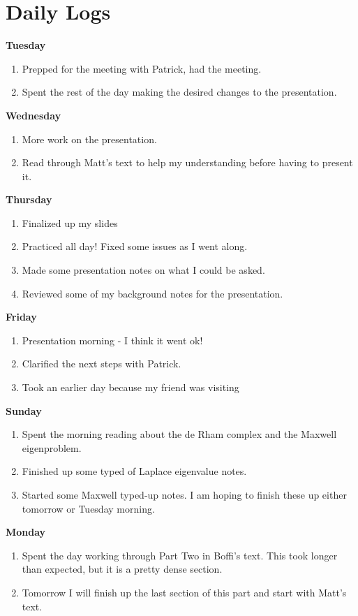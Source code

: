 \documentclass[12pt,a4paper]{article}
\begin{document}
\section{Daily Logs}

\textbf{Tuesday} 
\begin{enumerate}
    \item Prepped for the meeting with Patrick, had the meeting.
    \item Spent the rest of the day making the desired changes to the presentation.  
\end{enumerate}

\textbf{Wednesday}
\begin{enumerate}
    \item More work on the presentation.
    \item Read through Matt's text to help my understanding before having to present it.
\end{enumerate}

\textbf{Thursday}
\begin{enumerate}
    \item Finalized up my slides
    \item Practiced all day! Fixed some issues as I went along.
    \item Made some presentation notes on what I could be asked. 
    \item Reviewed some of my background notes for the presentation.
\end{enumerate}

\textbf{Friday}
\begin{enumerate}
    \item Presentation morning - I think it went ok!
    \item Clarified the next steps with Patrick.
    \item Took an earlier day because my friend was visiting
\end{enumerate}


\textbf{Sunday}
\begin{enumerate}
\item Spent the morning reading about the de Rham complex and the Maxwell eigenproblem.
\item Finished up some typed of Laplace eigenvalue notes.
\item Started some Maxwell typed-up notes. I am hoping to finish these up either tomorrow or Tuesday morning. 
\end{enumerate}

\textbf{Monday}
\begin{enumerate}
\item Spent the day working through Part Two in Boffi's text. This took longer than expected, but it is a pretty dense section. 
\item Tomorrow I will finish up the last section of this part and start with Matt's text.
\end{enumerate}
\end{document}
